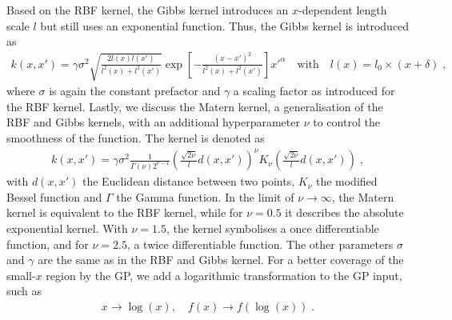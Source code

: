 \documentclass[11pt,a4paper]{article}
\begin{document}
Based on the RBF kernel, the Gibbs kernel introduces an $x$-dependent length scale $l$ but still uses an exponential function. Thus, the Gibbs kernel is introduced as
%
\begin{align}
    k(x, x') = \gamma \sigma^2 \sqrt{\frac{2l(x) l(x')}{l^2(x)+l^2(x')}} \exp \left[ - \frac{(x-x')^2}{l^2(x)+l^2(x')} \right] x'^\alpha \quad \text{with} \quad l(x) = l_0 \times (x+\delta) \; ,
    \label{eq:Gibbs}
\end{align}
%
where $\sigma$ is again the constant prefactor and $\gamma$ a scaling factor as introduced for the RBF kernel. 
Lastly, we discuss the Matern kernel, a generalisation of the RBF and Gibbs kernels, with an additional hyperparameter $\nu$ to control the smoothness of the function. The kernel is denoted as
%
\begin{align}
    k(x, x') = \gamma \sigma^2 \frac{1}{\Gamma(\nu) 2^{\nu-1}} \left(\frac{\sqrt{2\nu}}{l} d(x, x') \right)^\nu K_\nu \left(\frac{\sqrt{2\nu}}{l} d(x, x') \right) \; ,
    \label{eq:matern}
\end{align}
%
with $d(x, x')$ the Euclidean distance between two points, $K_\nu$ the modified Bessel function and $\Gamma$ the Gamma function. In the limit of $\nu \rightarrow \infty$, the Matern kernel is equivalent to the RBF kernel, while for $\nu =0.5$ it describes the absolute exponential kernel. With $\nu=1.5$, the kernel symbolises a once differentiable function, and for $\nu =2.5$, a twice differentiable function. The other parameters $\sigma$ and $\gamma$ are the same as in the RBF and Gibbs kernel. 
For a better coverage of the small-$x$ region by the GP, we add a logarithmic transformation to the GP input, such as
%
\begin{align}
    x \rightarrow \log(x), \quad f(x) \rightarrow f(\log(x))\; .
\end{align}

%
\end{document}
